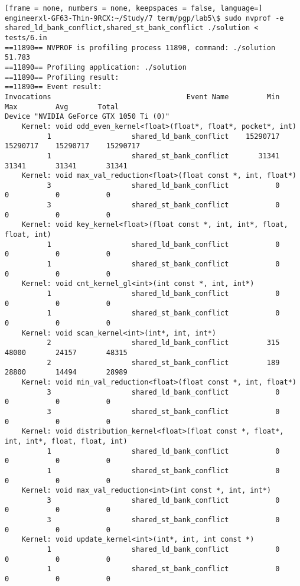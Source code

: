 \begin{lstlisting}[frame = none, numbers = none, keepspaces = false, language=]
engineerxl-GF63-Thin-9RCX:~/Study/7 term/pgp/lab5\$ sudo nvprof -e shared_ld_bank_conflict,shared_st_bank_conflict ./solution < tests/6.in
==11890== NVPROF is profiling process 11890, command: ./solution
51.783
==11890== Profiling application: ./solution
==11890== Profiling result:
==11890== Event result:
Invocations                                Event Name         Min         Max         Avg       Total
Device "NVIDIA GeForce GTX 1050 Ti (0)"
    Kernel: void odd_even_kernel<float>(float*, float*, pocket*, int)
          1                   shared_ld_bank_conflict    15290717    15290717    15290717    15290717
          1                   shared_st_bank_conflict       31341       31341       31341       31341
    Kernel: void max_val_reduction<float>(float const *, int, float*)
          3                   shared_ld_bank_conflict           0           0           0           0
          3                   shared_st_bank_conflict           0           0           0           0
    Kernel: void key_kernel<float>(float const *, int, int*, float, float, int)
          1                   shared_ld_bank_conflict           0           0           0           0
          1                   shared_st_bank_conflict           0           0           0           0
    Kernel: void cnt_kernel_gl<int>(int const *, int, int*)
          1                   shared_ld_bank_conflict           0           0           0           0
          1                   shared_st_bank_conflict           0           0           0           0
    Kernel: void scan_kernel<int>(int*, int, int*)
          2                   shared_ld_bank_conflict         315       48000       24157       48315
          2                   shared_st_bank_conflict         189       28800       14494       28989
    Kernel: void min_val_reduction<float>(float const *, int, float*)
          3                   shared_ld_bank_conflict           0           0           0           0
          3                   shared_st_bank_conflict           0           0           0           0
    Kernel: void distribution_kernel<float>(float const *, float*, int, int*, float, float, int)
          1                   shared_ld_bank_conflict           0           0           0           0
          1                   shared_st_bank_conflict           0           0           0           0
    Kernel: void max_val_reduction<int>(int const *, int, int*)
          3                   shared_ld_bank_conflict           0           0           0           0
          3                   shared_st_bank_conflict           0           0           0           0
    Kernel: void update_kernel<int>(int*, int, int const *)
          1                   shared_ld_bank_conflict           0           0           0           0
          1                   shared_st_bank_conflict           0           0           0           0
\end{lstlisting}
\pagebreak

